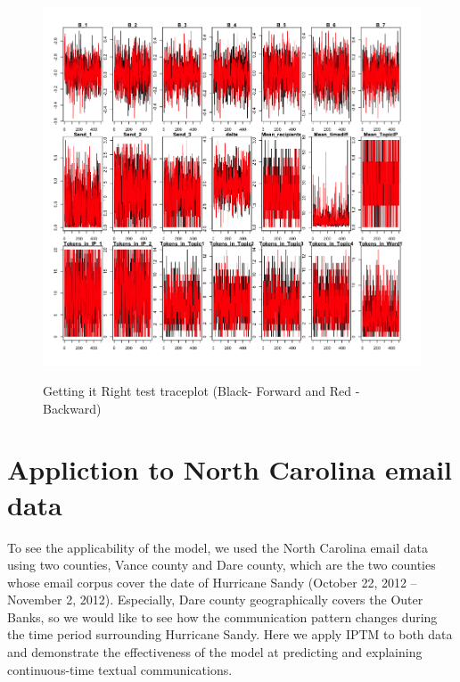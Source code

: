 \documentclass[a4paper]{article}
\begin{document}
\begin{figure}[H]
	\centering
	\includegraphics[width=1.05\textwidth]{trace.png} 
	\label{fig:GiRtrace}
	\caption{Getting it Right test traceplot (Black- Forward and Red - Backward)}
\end{figure}
 \section{Appliction to North Carolina email data}  \label{sec: Application to North Carolina email data}
 To see the applicability of the model, we used the North Carolina email data using two counties, Vance county and Dare county, which are the two counties whose email corpus cover the date of Hurricane Sandy (October 22, 2012 – November 2, 2012). Especially, Dare county geographically covers the Outer Banks, so we would like to see how the communication pattern changes during the time period surrounding Hurricane Sandy. Here we apply IPTM to both data and demonstrate the effectiveness of the model at predicting and explaining continuous-time textual communications.
\end{document}
